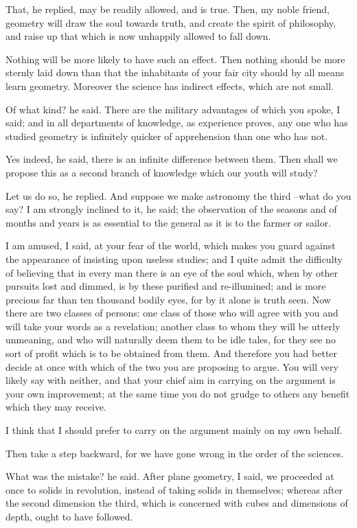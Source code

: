 That, he replied, may be readily allowed, and is true.
Then, my noble friend, geometry will draw the soul towards truth, and create the spirit of philosophy, and raise up that which is now unhappily allowed to fall down.

Nothing will be more likely to have such an effect.
Then nothing should be more sternly laid down than that the inhabitants of your fair city should by all means learn geometry. Moreover the science has indirect effects, which are not small.

Of what kind? he said.
There are the military advantages of which you spoke, I said; and in all departments of knowledge, as experience proves, any one who has studied geometry is infinitely quicker of apprehension than one who has not.

Yes indeed, he said, there is an infinite difference between them.
Then shall we propose this as a second branch of knowledge which our youth will study?

Let us do so, he replied.
And suppose we make astronomy the third --what do you say?
I am strongly inclined to it, he said; the observation of the seasons and of months and years is as essential to the general as it is to the farmer or sailor.

I am amused, I said, at your fear of the world, which makes you guard against the appearance of insisting upon useless studies; and I quite admit the difficulty of believing that in every man there is an eye of the soul which, when by other pursuits lost and dimmed, is by these purified and re-illumined; and is more precious far than ten thousand bodily eyes, for by it alone is truth seen. Now there are two classes of persons: one class of those who will agree with you and will take your words as a revelation; another class to whom they will be utterly unmeaning, and who will naturally deem them to be idle tales, for they see no sort of profit which is to be obtained from them. And therefore you had better decide at once with which of the two you are proposing to argue. You will very likely say with neither, and that your chief aim in carrying on the argument is your own improvement; at the same time you do not grudge to others any benefit which they may receive.

I think that I should prefer to carry on the argument mainly on my own behalf.

Then take a step backward, for we have gone wrong in the order of the sciences.

What was the mistake? he said.
After plane geometry, I said, we proceeded at once to solids in revolution, instead of taking solids in themselves; whereas after the second dimension the third, which is concerned with cubes and dimensions of depth, ought to have followed.

